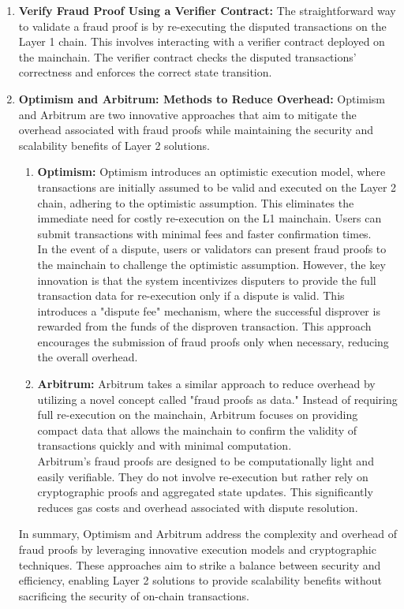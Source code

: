 \documentclass{report}
\begin{document}
\begin{enumerate}
	\item \textbf{Verify Fraud Proof Using a Verifier Contract:} The straightforward way to validate a fraud proof is by re-executing the disputed transactions on the Layer 1 chain. This involves interacting with a verifier contract deployed on the mainchain. The verifier contract checks the disputed transactions' correctness and enforces the correct state transition.
	\item \textbf{Optimism and Arbitrum: Methods to Reduce Overhead:} Optimism and Arbitrum are two innovative approaches that aim to mitigate the overhead associated with fraud proofs while maintaining the security and scalability benefits of Layer 2 solutions.
	\begin{enumerate}
		\item \textbf{Optimism:} Optimism introduces an optimistic execution model, where transactions are initially assumed to be valid and executed on the Layer 2 chain, adhering to the optimistic assumption. This eliminates the immediate need for costly re-execution on the L1 mainchain. Users can submit transactions with minimal fees and faster confirmation times.\\
		In the event of a dispute, users or validators can present fraud proofs to the mainchain to challenge the optimistic assumption. However, the key innovation is that the system incentivizes disputers to provide the full transaction data for re-execution only if a dispute is valid. This introduces a "dispute fee" mechanism, where the successful disprover is rewarded from the funds of the disproven transaction. This approach encourages the submission of fraud proofs only when necessary, reducing the overall overhead.
		\item \textbf{Arbitrum:} Arbitrum takes a similar approach to reduce overhead by utilizing a novel concept called "fraud proofs as data." Instead of requiring full re-execution on the mainchain, Arbitrum focuses on providing compact data that allows the mainchain to confirm the validity of transactions quickly and with minimal computation.\\
		Arbitrum's fraud proofs are designed to be computationally light and easily verifiable. They do not involve re-execution but rather rely on cryptographic proofs and aggregated state updates. This significantly reduces gas costs and overhead associated with dispute resolution.
	\end{enumerate}
	In summary, Optimism and Arbitrum address the complexity and overhead of fraud proofs by leveraging innovative execution models and cryptographic techniques. These approaches aim to strike a balance between security and efficiency, enabling Layer 2 solutions to provide scalability benefits without sacrificing the security of on-chain transactions.
\end{enumerate}
\end{document}
